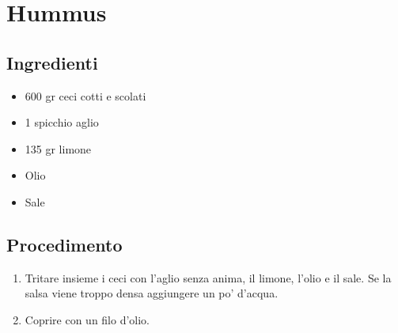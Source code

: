 \section{Hummus}
\subsection{Ingredienti}
\begin{itemize}
\item 600 gr ceci cotti e scolati  
\item 1 spicchio aglio  
\item 135 gr limone  
\item Olio  
\item Sale
\end{itemize}
\subsection{Procedimento}
\begin{enumerate}
\item  Tritare insieme i ceci con l'aglio senza anima, il limone, l'olio e il sale. Se la salsa viene troppo densa aggiungere un po' d'acqua.  
\item  Coprire con un filo d'olio.
\end{enumerate}
